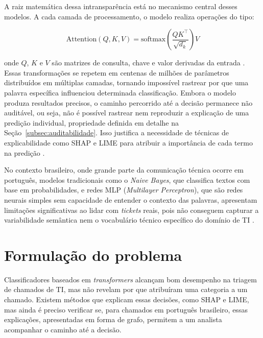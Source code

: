 \documentclass[
    12pt,                %
    openright,           %
    oneside,             %
    a4paper,             %
    english,             %
    brazil               %
]{abntex2}
\begin{document}
A raiz matemática dessa intransparência está no mecanismo central 
desses modelos. A cada camada de processamento, o modelo realiza 
operações do tipo:

\begin{equation*}
\text{Attention}(Q, K, V) = 
\text{softmax}\!\left(\frac{QK^{\top}}{\sqrt{d_k}}\right)V
\end{equation*}

onde $Q$, $K$ e $V$ são matrizes de consulta, chave e valor 
derivadas da entrada \cite{vaswani2017}. Essas transformações 
se repetem em centenas de milhões de parâmetros distribuídos 
em múltiplas camadas, tornando impossível rastrear por que uma 
palavra específica influenciou determinada classificação. Embora 
o modelo produza resultados precisos, o caminho percorrido até 
a decisão permanece não auditável, ou seja, não é possível rastrear 
nem reproduzir a explicação de uma predição individual, propriedade 
definida em detalhe na Seção~\ref{subsec:auditabilidade}. Isso 
justifica a necessidade de técnicas de explicabilidade como SHAP e 
LIME para atribuir a importância de cada termo na predição \cite{lundberg2017, ribeiro2016}.

No contexto brasileiro, onde grande parte da comunicação técnica 
ocorre em português, modelos tradicionais como o \textit{Naive 
Bayes}, que classifica textos com base em probabilidades, e redes 
MLP (\textit{Multilayer Perceptron}), que são redes neurais simples 
sem capacidade de entender o contexto das palavras, apresentam 
limitações significativas ao lidar com \textit{tickets} reais, 
pois não conseguem capturar a variabilidade semântica nem o 
vocabulário técnico específico do domínio de TI \cite{yokota2025}.

\vspace{0.3cm}


\section{Formulação do problema}
\label{sec:problema}

Classificadores baseados em \textit{transformers} alcançam bom desempenho na triagem de chamados de TI, mas não revelam por que atribuíram uma categoria a um chamado. Existem métodos que explicam essas decisões, como SHAP e LIME, mas ainda é preciso verificar se, para chamados em português brasileiro, essas explicações, apresentadas em forma de grafo, permitem a um analista acompanhar o caminho até a decisão.
\end{document}
